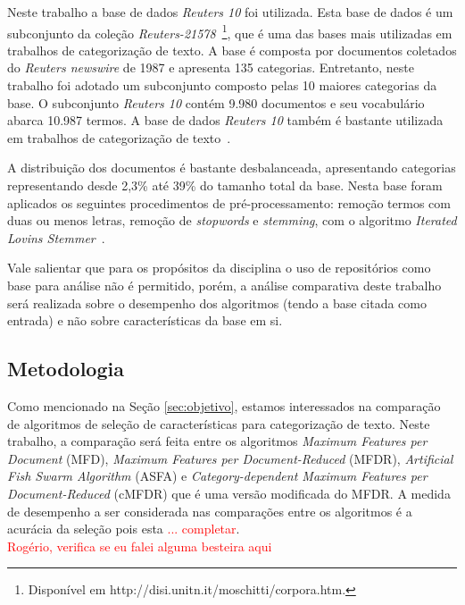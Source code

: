 \documentclass[conference]{IEEEtran}
\begin{document}
Neste trabalho a base de dados \textit{Reuters 10} foi utilizada.
Esta base de dados é um subconjunto da coleção \textit{Reuters-21578}~\footnote{Disponível em http://disi.unitn.it/moschitti/corpora.htm.}, que é uma das bases mais utilizadas em trabalhos de categorização de texto.
A base é composta por documentos coletados do \textit{Reuters newswire} de 1987 e apresenta 135 categorias.
Entretanto, neste trabalho foi adotado um subconjunto composto pelas 10 maiores categorias da base.
O subconjunto \textit{Reuters 10} contém 9.980 documentos e seu vocabulário abarca 10.987 termos.
A base de dados \textit{Reuters 10} também é bastante utilizada em trabalhos de categorização de texto~\cite{chang2008multilabel,chen2009feature,yang2011new}. 

A distribuição dos documentos é bastante desbalanceada, apresentando categorias representando desde 2,3\% até 39\% do tamanho total da base. 
Nesta base foram aplicados os seguintes procedimentos de pré-processamento:
remoção termos com duas ou menos letras, remoção de \textit{stopwords} e \textit{stemming}, com o algoritmo \textit{Iterated Lovins
Stemmer}~\cite{lovins1968development}.

Vale salientar que para os propósitos da disciplina o uso de repositórios como base para análise não é permitido, porém, a análise comparativa deste trabalho será realizada sobre o desempenho dos algoritmos (tendo a base citada como entrada) e não sobre características da base em si.

\subsection{Metodologia}
\label{sec:metodologia}

Como mencionado na Seção \ref{sec:objetivo}, estamos interessados na comparação de algoritmos de seleção de características para categorização de texto.
Neste trabalho, a comparação será feita entre os algoritmos \textit{Maximum Features per Document} (MFD), \textit{Maximum Features per Document-Reduced} (MFDR), \textit{Artificial Fish Swarm Algorithm} (ASFA) e \textit{Category-dependent Maximum Features per Document-Reduced} (cMFDR) que é uma versão modificada do MFDR.
A medida de desempenho a ser considerada nas comparações entre os algoritmos é a acurácia da seleção pois esta \textcolor{red} {... completar}.\\
\textcolor{red}{Rogério, verifica se eu falei alguma besteira aqui}
\end{document}
